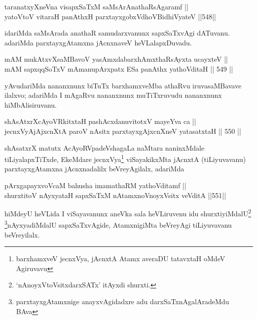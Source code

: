 
\begin{shl}
taranatxyXneVna visapxSaTxM saMsArAnathaRsAgaramf || \\
yatoV\s toV vitaraH panAthxH parxtayxgobxVdhoV\s BidhiVyateV \hfill ||548||  
\end{shl}

\begin{artha}
idariMda saMsArada anathaR samudarxvanunx sapxSaTxvAgi dATuvanu.
adariMda parxtayxgAtamxna jAcnxnaveV heVLalapxDuvadu.
\end{artha}

\begin{shl}
mAM mukAtxvX\s saMBavoV yasAmxdabarxhAmxthaRsAyxta ucayxteV || \\
mAM sapxqqSoTxV mAmanupArxpatx ESa panAthx yathoVditaH \hfill || 549 ||  
\end{shl}

\begin{artha}
yAvudariMda nananxnunx biTuTx barxhamxveMba athaRvu iruva\break saMBavave
ilalxvo; adariMda I mAgaRvu nananxnunx muTiTxruvudu nananxnunx hiMbAlisiruvanu.
\end{artha}


\begin{shl}
shAsAtxrXcAyoVRkitxtaH pashAcxdanuvitotxV mayeYva ca || \\
jecnxVyAjAjxcnXtA paroV nAsitx parxtayxgAjxcnXneV yatasatxtaH \hfill || 550 ||  
\end{shl}

\begin{artha}
shAsatxrX matutx AcAyoRVpadeVshagaLa naMtara naninxMdale
tiLiyalapxTiTxde, EkeMdare jecnxVya\footnote{barxhamxveV jecnxVya, jAcnxtA Atamx averaDU tatavxtaH oMdeV Agiruvavu} viSayakikxMta jAcnxtA (tiLiyuvavanu) parxtayxgAtamxna jAcnxnadalilx beVreyAgilalx, adariMda 
\end{artha}

\begin{shl}
pArxgapayxvoVcaM bahusha imamathaRM yathoVditamf || \\
shurxtitoV nAyxyataH sapxSaTxM nA\s \s tamxnoV\s noyxV\s sitx veVditA \hfill ||551||  
\end{shl}

\begin{artha}
hiMdeyU heVLida  I viSayavanunx aneVka sala heVLiruvenu idu
shurxtiyiMdalU\footnote{`nAnoyxVtoV\s sitxdarxSATx' itAyxdi
shurxti.} \footnote{parxtayxgAtamxnige anayxvAgidadxre adu
darxSaTxnAgalAradeMdu BAva}nAyxyadiMdalU sapxSaTxvAgide,
AtamxnigiMta beVreyAgi tiLiyuvavanu beVreyilalx.
\end{artha}

